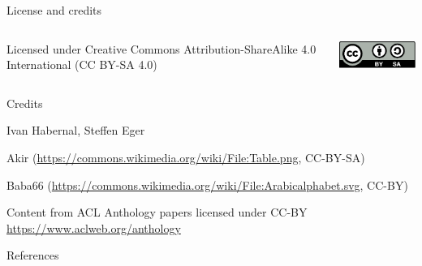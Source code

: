 \documentclass[12pt]{beamer}
\begin{document}
\begin{frame}{License and credits}

\begin{columns}
	\begin{column}{0.7\textwidth}
		Licensed under Creative Commons Attribution-ShareAlike 4.0 International (CC BY-SA 4.0)
	\end{column}
	\begin{column}{0.2\textwidth}
		\includegraphics[width=0.9\linewidth]{img/cc-by-sa-icon.pdf}
	\end{column}
\end{columns}

\bigskip

Credits

\begin{scriptsize}
	
Ivan Habernal, Steffen Eger

Akir (\url{https://commons.wikimedia.org/wiki/File:Table.png}, CC-BY-SA)

Baba66 (\url{https://commons.wikimedia.org/wiki/File:Arabicalphabet.svg}, CC-BY)

Content from ACL Anthology papers licensed under CC-BY \url{https://www.aclweb.org/anthology}

\end{scriptsize}

\end{frame}

\begin{frame}[allowframebreaks]{References}
\printbibliography
%  
%  
\end{frame}
\end{document}
